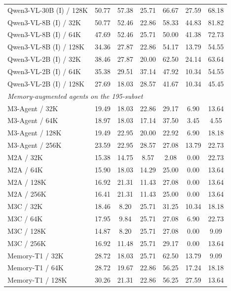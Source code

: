 \documentclass{llmxive}
\begin{document}
\begin{table}[!htbp]
\begin{tabular}{@{}lcccccc@{}}
Qwen3-VL-30B (I) / 128K   & 50.77 & 57.38 & 25.71 & 66.67 & 27.59 &  68.18 \\
Qwen3-VL-8B (I) / 32K     & 50.77 & 52.46 & 22.86 & 58.33 & 44.83 &  81.82 \\
Qwen3-VL-8B (I) / 64K     & 47.69 & 52.46 & 25.71 & 50.00 & 41.38 &  72.73 \\
Qwen3-VL-8B (I) / 128K    & 34.36 & 27.87 & 22.86 & 54.17 & 13.79 &  54.55 \\
Qwen3-VL-2B (I) / 32K     & 38.46 & 27.87 & 20.00 & 62.50 & 24.14 &  63.64 \\
Qwen3-VL-2B (I) / 64K     & 35.38 & 29.51 & 37.14 & 47.92 & 10.34 &  54.55 \\
Qwen3-VL-2B (I) / 128K    & 27.69 & 18.03 & 28.57 & 41.67 & 10.34 &  45.45 \\
\midrule
\multicolumn{7}{l}{\emph{Memory-augmented agents on the 195-subset}} \\
M3-Agent / 32K            & 19.49 & 18.03 & 22.86 & 29.17 &  6.90 & 13.64 \\
M3-Agent / 64K            & 18.97 & 18.03 & 17.14 & 37.50 &  3.45 &  4.55 \\
M3-Agent / 128K           & 19.49 & 22.95 & 20.00 & 22.92 &  6.90 & 18.18 \\
M3-Agent / 256K           & 23.59 & 22.95 & 28.57 & 27.08 & 13.79 & 22.73 \\
M2A / 32K                 & 15.38 & 14.75 &  8.57 &  2.08 &  0.00 & 22.73 \\
M2A / 64K                 & 15.90 & 18.03 & 14.29 & 25.00 &  0.00 & 13.64 \\
M2A / 128K                & 16.92 & 21.31 & 11.43 & 27.08 &  0.00 & 13.64 \\
M2A / 256K                & 16.41 & 21.31 & 11.43 & 25.00 &  0.00 & 13.64 \\
M3C / 32K                 & 18.46 &  8.20 & 25.71 & 31.25 & 10.34 & 18.18 \\
M3C / 64K                 & 17.95 &  9.84 & 25.71 & 27.08 &  6.90 & 22.73 \\
M3C / 128K                & 14.87 &  8.20 & 25.71 & 27.08 &  0.00 &  9.09 \\
M3C / 256K                & 16.92 & 11.48 & 25.71 & 29.17 &  0.00 & 13.64 \\
Memory-T1 / 32K           & 28.72 & 18.03 & 25.71 & 62.50 & 13.79 &  9.09 \\
Memory-T1 / 64K           & 28.72 & 19.67 & 22.86 & 56.25 & 17.24 & 18.18 \\
Memory-T1 / 128K          & 30.26 & 21.31 & 22.86 & 56.25 & 27.59 & 13.64 \\

\end{tabular}
\end{table}
\end{document}
